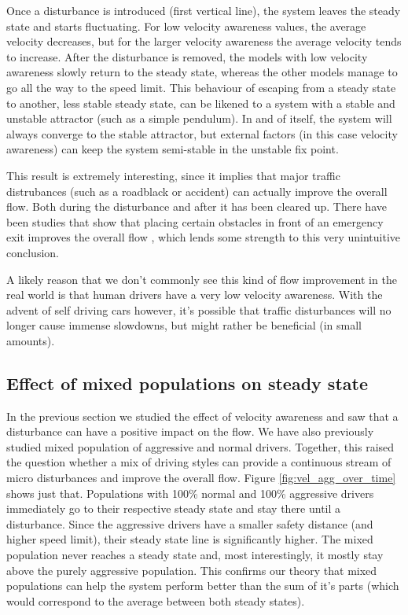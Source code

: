 \documentclass[11pt,a4paper,twocolumn]{article}
\begin{document}
Once a disturbance is introduced (first vertical line), the system leaves the steady state and starts fluctuating. For low velocity awareness values, the average velocity decreases, but for the larger velocity awareness the average velocity tends to increase.
After the disturbance is removed, the models with low velocity awareness slowly return to the steady state, whereas the other models manage to go all the way to the speed limit. This behaviour of escaping from a steady state to another, less stable steady state, can be likened to a system with a stable and unstable attractor (such as a simple pendulum). In and of itself, the system will always converge to the stable attractor, but external factors (in this case velocity awareness) can keep the system semi-stable in the unstable fix point.

This result is extremely interesting, since it implies that major traffic distrubances (such as a roadblack or accident) can actually improve the overall flow. Both during the disturbance and after it has been cleared up.
There have been studies that show that placing certain obstacles in front of an emergency exit improves the overall flow \cite{yanagisawa2009obstacle}, which lends some strength to this very unintuitive conclusion.

A likely reason that we don't commonly see this kind of flow improvement in the real world is that human drivers have a very low velocity awareness. With the advent of self driving cars however, it's possible that traffic disturbances  will no longer cause immense slowdowns, but might rather be beneficial (in small amounts).

\subsection{Effect of mixed populations on steady state}
In the previous section we studied the effect of velocity awareness and saw that a disturbance can have a positive impact on the flow. We have also previously studied mixed population of aggressive and normal drivers. Together, this raised the question whether a mix of driving styles can provide a continuous stream of micro disturbances and improve the overall flow. Figure \ref{fig:vel_agg_over_time} shows just that.
Populations with 100\% normal and 100\% aggressive drivers immediately go to their respective steady state and stay there until a disturbance. Since the aggressive drivers have a smaller safety distance (and higher speed limit), their steady state line is significantly higher. The mixed population never reaches a steady state and, most interestingly, it mostly stay above the purely aggressive population. This confirms our theory that mixed populations can help the system perform better than the sum of it's parts (which would correspond to the average between both steady states).
\end{document}
